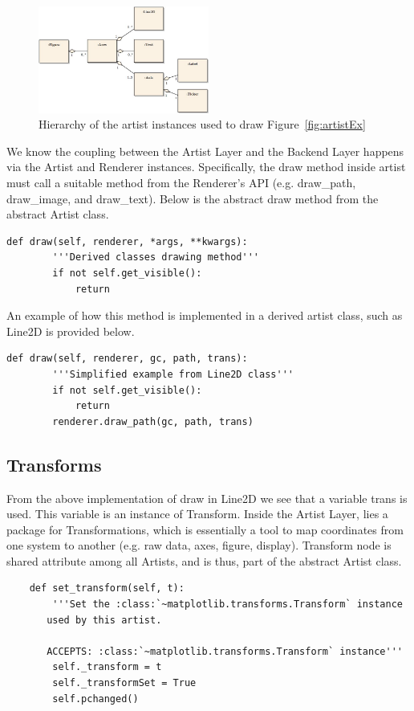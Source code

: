 \documentclass[pdftex,10pt,a4paper]{report}
\begin{document}
\begin{figure}[ht!]
        \centering
                \includegraphics[width=0.5\textwidth]{img/umls/arch/artistExAgg}
        \caption{Hierarchy of the artist instances used to draw Figure~\ref{fig:artistEx}}\label{fig:artistExAgg}
\end{figure}

We know the coupling between the Artist Layer and the Backend Layer happens via the Artist and Renderer instances. Specifically, the draw method inside artist must call a suitable method from the Renderer's API (e.g. draw\_path, draw\_image, and draw\_text). Below is the abstract draw method from the abstract Artist class.


\begin{lstlisting}
def draw(self, renderer, *args, **kwargs):
        '''Derived classes drawing method'''
        if not self.get_visible():
            return
\end{lstlisting}

An example of how this method is implemented in a derived artist class, such as Line2D is provided below.

\begin{lstlisting}
def draw(self, renderer, gc, path, trans):
        '''Simplified example from Line2D class'''
        if not self.get_visible():
            return
        renderer.draw_path(gc, path, trans)
\end{lstlisting}

\subsection{Transforms}

From the above implementation of draw in Line2D we see that a variable trans is used. This variable is an instance of Transform. Inside the Artist Layer, lies a package for Transformations, which is essentially a tool to map coordinates from one system to another (e.g. raw data, axes, figure, display). Transform node is shared attribute among all Artists, and is thus, part of the abstract Artist class. 
\begin{lstlisting}
    def set_transform(self, t):
        '''Set the :class:`~matplotlib.transforms.Transform` instance
       used by this artist.

       ACCEPTS: :class:`~matplotlib.transforms.Transform` instance'''
        self._transform = t
        self._transformSet = True
        self.pchanged()
\end{lstlisting}
\end{document}
